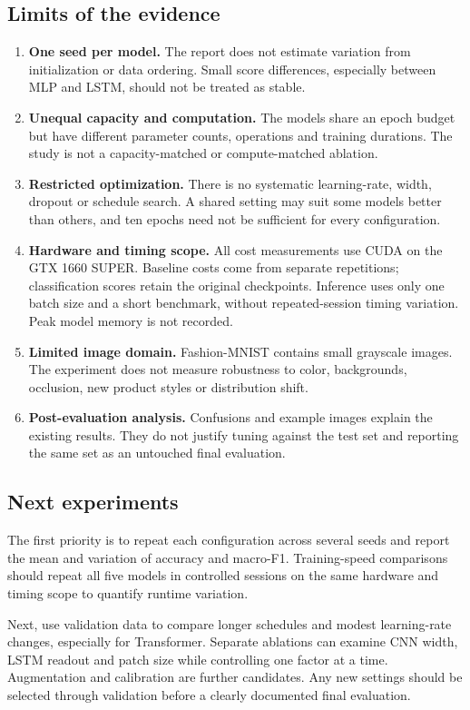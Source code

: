 \subsection{Limits of the evidence}
\begin{enumerate}
\item \textbf{One seed per model.} The report does not estimate variation from
initialization or data ordering. Small score differences, especially between
MLP and LSTM, should not be treated as stable.
\item \textbf{Unequal capacity and computation.} The models share an epoch budget
but have different parameter counts, operations and training durations.
The study is not a capacity-matched or compute-matched ablation.
\item \textbf{Restricted optimization.} There is no systematic learning-rate,
width, dropout or schedule search. A shared setting may suit some models better
than others, and ten epochs need not be sufficient for every configuration.
\item \textbf{Hardware and timing scope.} All cost measurements use CUDA on
the GTX 1660 SUPER. Baseline costs come from separate repetitions; classification
scores retain the original checkpoints. Inference uses only one batch size and a short benchmark,
without repeated-session timing variation. Peak model memory is not recorded.
\item \textbf{Limited image domain.} Fashion-MNIST contains small grayscale
images. The experiment does not measure robustness to color, backgrounds,
occlusion, new product styles or distribution shift.
\item \textbf{Post-evaluation analysis.} Confusions and example images explain
the existing results. They do not justify tuning against the test set and
reporting the same set as an untouched final evaluation.
\end{enumerate}

\subsection{Next experiments}
The first priority is to repeat each configuration across several seeds and
report the mean and variation of accuracy and macro-F1. Training-speed
comparisons should repeat all five models in controlled sessions on the same
hardware and timing scope to quantify runtime variation.

Next, use validation data to compare longer schedules and modest learning-rate
changes, especially for Transformer. Separate ablations can examine CNN width,
LSTM readout and patch size while controlling one factor at a time.
Augmentation and calibration are further candidates. Any new settings should
be selected through validation before a clearly documented final evaluation.
